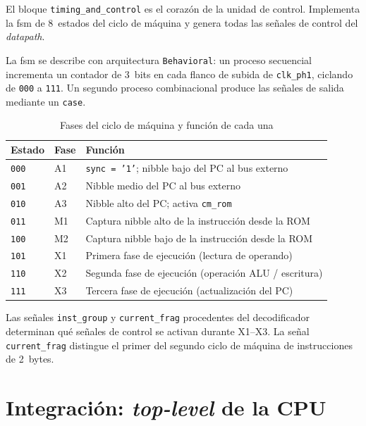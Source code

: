 \documentclass[%
    school=etsisi,%
    type=pfg,%
    degree=61CI,%
]{upm-report}
\begin{document}
El bloque \texttt{timing\_and\_control} es el corazón de la unidad de
control.  Implementa la \acrfull{fsm} de 8~estados del ciclo de máquina y
genera todas las señales de control del \textit{datapath}.

La \acrshort{fsm} se describe con arquitectura \texttt{Behavioral}: un proceso
secuencial incrementa un contador de 3~bits en cada flanco de subida de
\texttt{clk\_ph1}, ciclando de \texttt{000} a \texttt{111}.  Un segundo
proceso combinacional produce las señales de salida mediante un \texttt{case}.

\begin{table}[H]
\centering
\caption{Fases del ciclo de máquina y función de cada una}
\label{tab:fases}
\begin{tabularx}{\textwidth}{@{}llX@{}}
\toprule
\textbf{Estado} & \textbf{Fase} & \textbf{Función} \\
\midrule
\texttt{000} & A1 & \texttt{sync = '1'}; nibble bajo del PC al bus externo \\
\texttt{001} & A2 & Nibble medio del PC al bus externo \\
\texttt{010} & A3 & Nibble alto del PC; activa \texttt{cm\_rom} \\
\texttt{011} & M1 & Captura nibble alto de la instrucción desde la ROM \\
\texttt{100} & M2 & Captura nibble bajo de la instrucción desde la ROM \\
\texttt{101} & X1 & Primera fase de ejecución (lectura de operando) \\
\texttt{110} & X2 & Segunda fase de ejecución (operación ALU / escritura) \\
\texttt{111} & X3 & Tercera fase de ejecución (actualización del PC) \\
\bottomrule
\end{tabularx}
\end{table}

Las señales \texttt{inst\_group} y \texttt{current\_frag} procedentes del
decodificador determinan qué señales de control se activan durante X1--X3.
La señal \texttt{current\_frag} distingue el primer del segundo ciclo de
máquina de instrucciones de 2~bytes.

\section{Integración: \textit{top-level} de la CPU}
\label{s:integracion}
\end{document}
